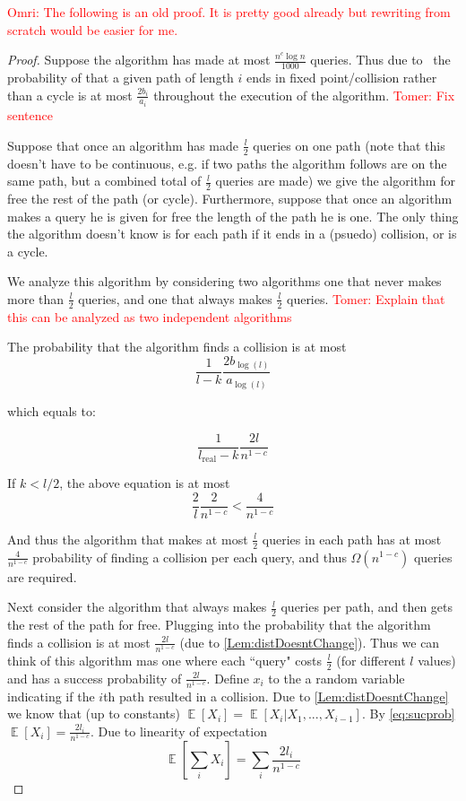 \documentclass[11pt]{article}
\numberwithin{equation}{section}
\newcommand\E{\mathop{\mathbb E}}
\newcommand{\1}{\mathbf{1}}
\newcommand{\beq}{\begin{equation}}
\newcommand{\eeq}{\end{equation}}
\newcommand\omri[1]{{\textcolor{red}{Omri: #1}}}
\newcommand\tomer[1]{{\textcolor{red}{Tomer: #1}}}
\begin{document}
\iffalse
\omri{The following is an old proof. It is pretty good already but rewriting from scratch would be easier for me.}
\begin{proof}  Suppose the algorithm has made at most $\frac{n^c \log n}{1000}$ queries. Thus due to~ the probability of that a given path of length $i$ ends in fixed point/collision rather than a cycle is at most $\frac{2b_i}{a_i}$ throughout the execution of the algorithm. \tomer{Fix sentence}


Suppose that once an algorithm has made $\frac{l}{2}$ queries on one path (note that this doesn't have to be continuous, e.g. if two paths the algorithm follows are on the same path, but a combined total of $\frac{l}{2}$ queries are made) we give the algorithm for free the rest of the path (or cycle). Furthermore, suppose that once an algorithm makes a query he is given for free the length of the path he is one. The only thing the algorithm doesn't know is for each path if it ends in a (psuedo) collision, or is a cycle.

We analyze this algorithm by considering two algorithms one that never makes more than $\frac{l}{2}$ queries, and one that always makes $\frac{l}{2}$ queries. \tomer{Explain that this can be analyzed as two independent algorithms}



\newcommand{\lreal}{l_{\text{real}}}


The probability that the algorithm finds a collision is at most 
\beq  \label{eq:sucprob}
\frac{1}{l-k} \frac{2b_{\log(l)}}{a_{\log(l)}}
\eeq

which equals to:

\beq
\frac{1}{\lreal-k} \frac{2l}{n^{1-c}}
\eeq





If $k < l/2$, the above equation is at most  
\beq \frac{2}{l} \frac{2}{n^{1-c}} < \frac{4}{n^{1-c}} \eeq 

And thus the algorithm that makes at most $\frac{l}{2}$ queries in each path has at most $\frac{4}{n^{1-c}}$ probability of finding a collision per each query, and thus $\Omega(n^{1-c})$ queries are required.



Next consider the algorithm that always makes $\frac{l}{2}$ queries per path, and then gets the rest of the path for free. Plugging into  the probability that the algorithm finds a collision is at most $\frac{2l}{n^{1-c}}$ (due to \ref{Lem:distDoesntChange}). Thus we can think of this algorithm mas one where each ``query" costs $\frac{l}{2}$ (for different $l$ values) and has a success probability of $\frac{2l}{n^{1-c}}$. Define $x_i$ to the a random variable indicating if the $i$th path resulted in a collision. Due to \ref{Lem:distDoesntChange} we know that (up to constants) $\E[X_i] = \E[X_i | X_1,...,X_{i-1}]$. By \ref{eq:sucprob} $\E[X_i] = \frac{2l_i}{n^{1-c}}$. Due to linearity of expectation \beq \E[\sum_i X_i] = \sum_i \frac{2l_i}{n^{1-c}} \eeq


\end{proof}
\end{document}

